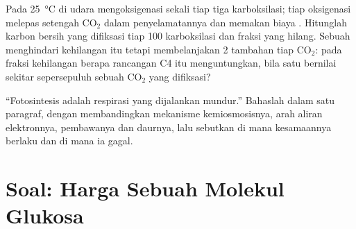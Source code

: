 \begin{exercise}[$\star\star\star$]\label{exo:b1:photosynthesis:11}
Pada \qty{25}{\celsius} di udara  mengoksigenasi sekali tiap tiga
karboksilasi; tiap oksigenasi melepas setengah $\mathrm{CO_2}$ dalam
penyelamatannya dan memakan biaya . Hitunglah karbon bersih yang
difiksasi tiap 100 karboksilasi dan fraksi yang hilang. Sebuah  menghindari kehilangan itu tetapi membelanjakan 2  tambahan tiap
$\mathrm{CO_2}$: pada fraksi kehilangan berapa rancangan C4 itu
menguntungkan, bila satu  bernilai sekitar sepersepuluh sebuah
$\mathrm{CO_2}$ yang difiksasi?
\end{exercise}

\begin{exercise}[$\star\star\star$]\label{exo:b1:photosynthesis:12}
``Fotosintesis adalah respirasi yang dijalankan mundur.'' Bahaslah dalam
satu paragraf, dengan membandingkan mekanisme kemiosmosisnya, arah
aliran elektronnya, pembawanya dan daurnya, lalu sebutkan di mana
kesamaannya berlaku dan di mana ia gagal.
\end{exercise}

\section{Soal: Harga Sebuah Molekul Glukosa}


